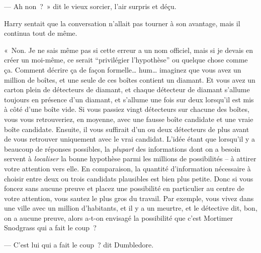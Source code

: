 --- Ah non~?~»
dit le vieux sorcier, l'air surpris et déçu.

Harry sentait que la conversation n'allait pas tourner à son avantage, mais il continua tout de même.

«~Non. Je ne sais même pas si cette erreur a un nom officiel, mais si je devais en créer un moi-même, ce serait “privilégier l'hypothèse” ou quelque chose comme ça.
Comment décrire ça de façon formelle… hum… imaginez que vous avez un million de boîtes, et une seule de ces boîtes contient un diamant.
Et vous avez un carton plein de détecteurs de diamant, et chaque détecteur de diamant s'allume toujours en présence d'un diamant, et s'allume une fois sur deux lorsqu'il est mis à côté d'une boîte vide.
Si vous passiez vingt détecteurs sur chacune des boîtes, vous vous retrouveriez, en moyenne, avec une fausse boîte candidate et une vraie boîte candidate.
Ensuite, il vous suffirait d'un ou deux détecteurs de plus avant de vous retrouver uniquement avec le vrai candidat.
L'idée étant que lorsqu'il y a beaucoup de réponses possibles, la \emph{plupart} des informations dont on a besoin servent à \emph{localiser} la bonne hypothèse parmi les millions de possibilités -- à attirer votre attention vers elle.
En comparaison, la quantité d'information nécessaire à choisir entre deux ou trois candidats plausibles est bien plus petite.
Donc si vous foncez sans aucune preuve et placez une possibilité en particulier au centre de votre attention, vous sautez le plus gros du travail.
Par exemple, vous vivez dans une ville avec un million d'habitants, et il y a un meurtre, et le détective dit, bon, on a aucune preuve, alors a-t-on envisagé la possibilité que c'est Mortimer Snodgrass qui a fait le coup~?

--- C'est lui qui a fait le coup~? dit Dumbledore.


